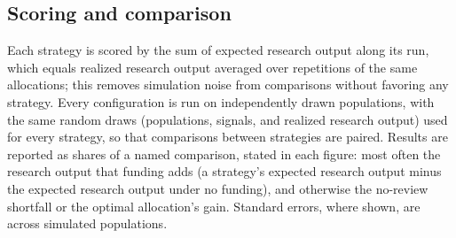\subsection*{Scoring and comparison}
Each strategy is scored by the sum of expected research output along its run, which equals realized research output averaged over repetitions of the same allocations; this removes simulation noise from comparisons without favoring any strategy. Every configuration is run on independently drawn populations, with the same random draws (populations, signals, and realized research output) used for every strategy, so that comparisons between strategies are paired. Results are reported as shares of a named comparison, stated in each figure: most often the research output that funding adds (a strategy's expected research output minus the expected research output under no funding), and otherwise the no-review shortfall or the optimal allocation's gain. Standard errors, where shown, are across simulated populations.

